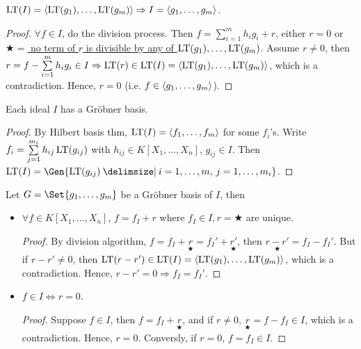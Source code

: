 \begin{prop}
  $\operatorname{LT}(I) = \langle\operatorname{LT}(g_1),\dots,\operatorname{LT}(g_m)\rangle \Rightarrow I = \langle g_1,\dots,g_m\rangle$.
  \begin{proof}
    $\forall f \in I$, do the division process. Then
    $f = \sum\limits_{i=1}^m h_ig_i+r$, either $r=0$ or
    \uline{$\bigstar =$ no term of $r$ is divisible by any of
    $\operatorname{LT}(g_1),\dots,\operatorname{LT}(g_m)$}. Assume $r \neq 0$, then
    $r = f - \sum\limits_{i=1}^m h_i g_i \in I \Rightarrow \operatorname{LT}(r) \in \operatorname{LT}(I) =
    \langle \operatorname{LT}(g_1),\dots, \operatorname{LT}(g_m) \rangle$, which is a contradiction.
    Hence, $r = 0$ (i.e. $f\in \langle g_1,\dots,g_m \rangle$).
  \end{proof}
\end{prop}

\begin{theorem} \label{thm:Grobner-existense}
  Each ideal $I$ has a Gr\"{o}bner basis.
  \begin{proof}
    By Hilbert basis thm, $\operatorname{LT}(I) = \langle f_1,\dots,f_m \rangle$ for some $f_i$'s.
    Write $f_i = \sum\limits_{j=1}^{m_i} h_{ij}\operatorname{LT}(g_{ij})$ with
    $h_{ij} \in K[X_1,\dots,X_n]$, $g_{ij} \in I$. Then
    $\LT(I) = \Gen{ \LT(g_{ij}) \given i=1,\dots,m,\, j=1,\dots,m_i}$.
  \end{proof}
\end{theorem}

\begin{theorem} \label{thm:Grobner-property}
  Let $G = \Set{g_1,\dots,g_m}$ be a Gr\"{o}bner basis of $I$, then
  \begin{itemize}
    \item $\forall f \in K[X_1,\dots,X_n]$, $f = f_I + r$ where
      $f_I \in I, r = \bigstar$ are unique.
      \begin{proof}
        By division algorithm, $f = f_I +\underset{\bigstar}{r} =
        f_I'+\underset{\bigstar}{r'}$, then $\underset{\bigstar}{r-r'} = f_I-f_I'$.
        But if $r-r' \neq 0$, then $\operatorname{LT}(r-r') \in \operatorname{LT}(I) =
        \langle \operatorname{LT}(g_1),\dots,\operatorname{LT}(g_m) \rangle$, which is a contradiction.
        Hence, $r-r' = 0\Rightarrow f_I = f_I'$.
      \end{proof}
    \item $f \in I \iff r=0$.
      \begin{proof}
        Suppose $f \in I$, then $f = f_I + \underset{\bigstar}{r}$, and if $r\neq 0$,
        $\underset{\bigstar}{r} = f - f_I\in I$, which is a contradiction.
        Hence, $r = 0$. Conversly, if $r = 0$, $f = f_I \in I$. 
      \end{proof}
  \end{itemize}
\end{theorem}


